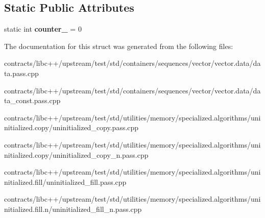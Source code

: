 \subsection*{Static Public Attributes}
\begin{DoxyCompactItemize}
\item 
\mbox{\label{struct_nasty_a6e335e7837408e0f8db94e38a14a3e53}} 
static int {\bfseries counter\+\_\+} = 0
\end{DoxyCompactItemize}


The documentation for this struct was generated from the following files\+:\begin{DoxyCompactItemize}
\item 
contracts/libc++/upstream/test/std/containers/sequences/vector/vector.\+data/data.\+pass.\+cpp\item 
contracts/libc++/upstream/test/std/containers/sequences/vector/vector.\+data/data\+\_\+const.\+pass.\+cpp\item 
contracts/libc++/upstream/test/std/utilities/memory/specialized.\+algorithms/uninitialized.\+copy/uninitialized\+\_\+copy.\+pass.\+cpp\item 
contracts/libc++/upstream/test/std/utilities/memory/specialized.\+algorithms/uninitialized.\+copy/uninitialized\+\_\+copy\+\_\+n.\+pass.\+cpp\item 
contracts/libc++/upstream/test/std/utilities/memory/specialized.\+algorithms/uninitialized.\+fill/uninitialized\+\_\+fill.\+pass.\+cpp\item 
contracts/libc++/upstream/test/std/utilities/memory/specialized.\+algorithms/uninitialized.\+fill.\+n/uninitialized\+\_\+fill\+\_\+n.\+pass.\+cpp\end{DoxyCompactItemize}
